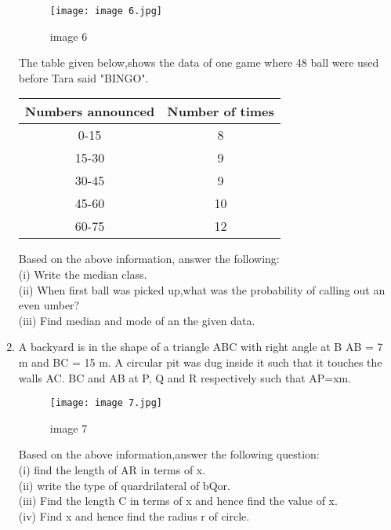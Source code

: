 \documentclass{article}
\begin{document}
\begin{enumerate}
\begin{figure}[h!]
\centering
\texttt{[image: image 6.jpg]}
\label{fig:image 6}
\caption{image 6}
\end{figure}

\text The table given below,shows the data of one game where 48 ball were used before Tara said "BINGO".
\begin{center}
\begin{tabular}{|c|c|}
\hline
Numbers announced & Number of times \\
\hline
0-15 & 8 \\
\hline
15-30 & 9 \\
\hline
30-45 & 9 \\
\hline
45-60 & 10 \\
\hline
60-75 & 12 \\
\hline
\end{tabular}
\end{center}
\text Based on the above information, answer the following:\\
(i)  Write the median class.\\
(ii) When first ball was picked up,what was the probability of calling out an even umber?\\
(iii) Find median and mode of an the given data.
\newpage
\item A backyard is in the shape of a triangle ABC with right angle at B AB = 7 m and BC = 15 m. A circular pit was dug inside it such that it touches the walls AC. BC and AB at P, Q and R respectively such that AP=xm.
\begin{figure}[h!]
\centering
\texttt{[image: image 7.jpg]}
\label{fig:image 7}
\caption{image 7}
\end{figure}
\text Based on the above information,answer the following question:\\
(i) find the length of AR in terms of x.\\
(ii) write the type of quardrilateral of bQor.\\
(iii) Find the length C in terms of x and hence find the value of x.\\
(iv) Find x and hence find the radius r of circle.
\end{enumerate}
\end{document}
